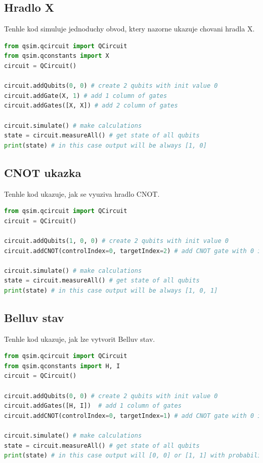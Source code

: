 \documentclass[11pt]{article}
\begin{document}
\subsection{Hradlo X}
Tenhle kod simuluje jednoduchy obvod, ktery nazorne ukazuje chovani hradla X.
\begin{lstlisting}[language=Python, caption=X gates]
from qsim.qcircuit import QCircuit
from qsim.qconstants import X
circuit = QCircuit()

circuit.addQubits(0, 0) # create 2 qubits with init value 0
circuit.addGate(X, 1) # add 1 column of gates
circuit.addGates([X, X]) # add 2 column of gates

circuit.simulate() # make calculations
state = circuit.measureAll() # get state of all qubits
print(state) # in this case output will be always [1, 0]
\end{lstlisting}

\subsection{CNOT ukazka}
Tenhle kod ukazuje, jak se vyuziva hradlo CNOT.
\begin{lstlisting}[language=Python, caption=CNOT example]
from qsim.qcircuit import QCircuit
circuit = QCircuit()

circuit.addQubits(1, 0, 0) # create 2 qubits with init value 0
circuit.addCNOT(controlIndex=0, targetIndex=2) # add CNOT gate with 0 index qubit as control and 2 index as target

circuit.simulate() # make calculations
state = circuit.measureAll() # get state of all qubits
print(state) # in this case output will be always [1, 0, 1]
\end{lstlisting}

\subsection{Belluv stav}
Tenhle kod ukazuje, jak lze vytvorit Belluv stav.
\begin{lstlisting}[language=Python, caption=Bell state]
from qsim.qcircuit import QCircuit
from qsim.qconstants import H, I
circuit = QCircuit()

circuit.addQubits(0, 0) # create 2 qubits with init value 0
circuit.addGates([H, I])  # add 1 column of gates
circuit.addCNOT(controlIndex=0, targetIndex=1) # add CNOT gate with 0 index qubit as control and 1 index as target

circuit.simulate() # make calculations
state = circuit.measureAll() # get state of all qubits
print(state) # in this case output will [0, 0] or [1, 1] with probability of 0.5
\end{lstlisting}
\end{document}
